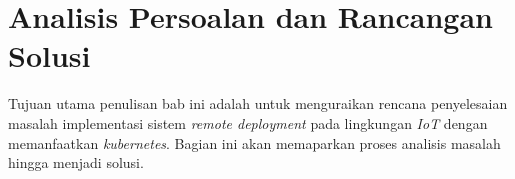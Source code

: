 \chapter{Analisis Persoalan dan Rancangan Solusi}

Tujuan utama penulisan bab ini adalah untuk menguraikan rencana penyelesaian masalah implementasi sistem \textit{remote deployment} pada lingkungan \textit{IoT} dengan memanfaatkan \textit{kubernetes}. Bagian ini akan memaparkan proses analisis masalah hingga menjadi solusi.





